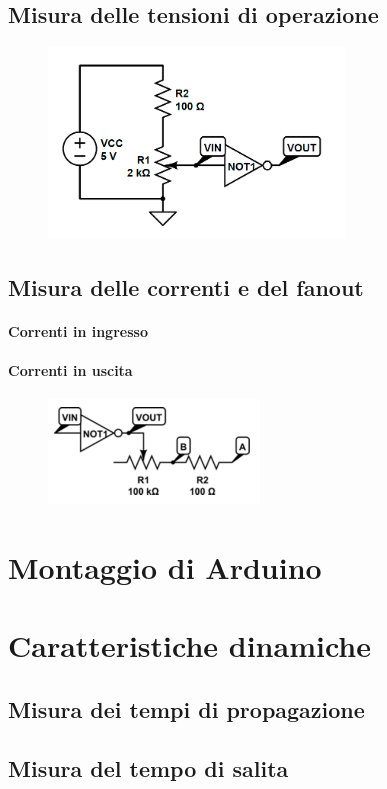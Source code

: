 \documentclass[a4paper,10pt]{article}
\begin{document}
\subsection{Misura delle tensioni di operazione}

\begin{figure}[H]
	\centering
	\includegraphics[width=0.7\textwidth]{../grafici/NOTin.png}
	\caption{}
	\label{fig:NOTin}
\end{figure}

\subsection{Misura delle correnti e del fanout}

\paragraph{Correnti in ingresso}

\paragraph{Correnti in uscita}

\begin{figure}[H]
	\centering
	\includegraphics[width=0.5\textwidth]{../grafici/NOTout.png}
	\caption{}
	\label{fig:NOTout}
\end{figure}


\section{Montaggio di Arduino}

\section{Caratteristiche dinamiche}

\subsection{Misura dei tempi di propagazione}

\subsection{Misura del tempo di salita}
\end{document}
